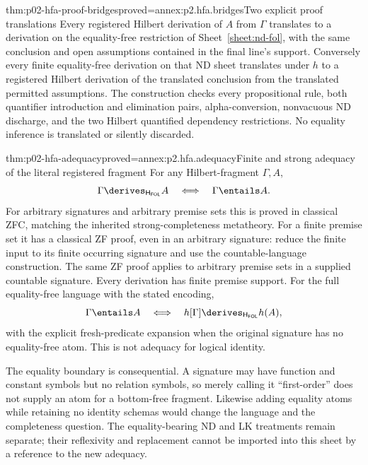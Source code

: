 \begin{hbtheorem}{thm:p02-hfa-proof-bridges}{proved=annex:p2.hfa.bridges}{Two explicit proof translations}
Every registered Hilbert derivation of \(A\) from \(\Gamma\)
translates to a derivation on the equality-free restriction of
Sheet~\ref{sheet:nd-fol}, with the same conclusion and open assumptions
contained in the final line's support. Conversely every finite
equality-free derivation on that ND sheet translates under \(h\)
to a registered Hilbert derivation of the translated conclusion from
the translated permitted assumptions. The construction checks every
propositional rule, both quantifier introduction and elimination pairs,
alpha-conversion, nonvacuous ND discharge, and the two Hilbert quantified
dependency restrictions. No equality inference is translated or
silently discarded.
\end{hbtheorem}

\begin{hbtheorem}{thm:p02-hfa-adequacy}{proved=annex:p2.hfa.adequacy}{Finite and strong adequacy of the literal registered fragment}
For any Hilbert-fragment \(\Gamma,A\),
\[
 \Gamma\derives_{\mathsf H_{\mathsf{FOL}}}A
 \quad\Longleftrightarrow\quad\Gamma\entails A.
\]
For arbitrary signatures and arbitrary premise sets this is proved in
classical ZFC, matching the inherited strong-completeness metatheory.
For a finite premise set it has a classical ZF proof, even in an
arbitrary signature: reduce the finite input to its finite occurring
signature and use the countable-language construction. The same ZF
proof applies to arbitrary premise sets in a supplied countable
signature. Every derivation has finite premise support. For the
full equality-free language with the stated encoding,
\[
 \Gamma\entails A
 \quad\Longleftrightarrow\quad
 h[\Gamma]\derives_{\mathsf H_{\mathsf{FOL}}}h(A),
\]
with the explicit fresh-predicate expansion when the original signature
has no equality-free atom. This is not adequacy for logical identity.
\end{hbtheorem}

The equality boundary is consequential. A signature may have function and
constant symbols but no relation symbols, so merely calling it
``first-order'' does not supply an atom for a bottom-free fragment.
Likewise adding equality atoms while retaining no identity schemas would
change the language and the completeness question. The equality-bearing
ND and LK treatments remain separate; their reflexivity and replacement
cannot be imported into this sheet by a reference to the new adequacy.
